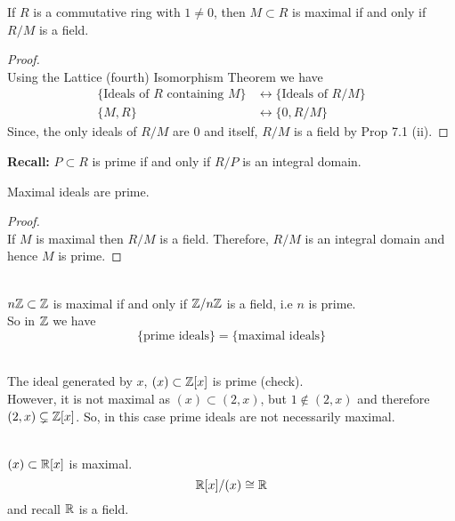 \documentclass[../Main.tex]{subfiles}
\begin{document}
\begin{thm}[title = \texorpdfstring{$M$}{M} maximal in comm. \texorpdfstring{$R \Longleftrightarrow R/M$}{R iff R/M} is field]
	If $R$ is a commutative ring with $1\ne 0$, then $M\subset R$ is maximal if and only if $R/M$ is a field.
\end{thm}

\begin{proof}~\\
	Using the Lattice (fourth) Isomorphism Theorem  we have
	\begin{align*}
	\{\text{Ideals of } R \text{ containing } M \} &\longleftrightarrow \{\text{Ideals of } R/M\}\\
	\{M,R\} &\longleftrightarrow \{0, R/M\}
	\end{align*}
	Since, the only ideals of $R/M$ are $0$ and itself, $R/M$ is a field by Prop 7.1 (ii).
\end{proof}
\textbf{Recall:} $P\subset R$ is prime if and only if $R/P$ is an integral domain.
\begin{crl}[title= Maximal ideals are prime]
	Maximal ideals are prime.
\end{crl}
\begin{proof}~\\
	If $M$ is maximal then $R/M$ is a field. Therefore, $R/M$ is an integral domain and hence $M$ is prime.
\end{proof}
\begin{example}~\\
	$n\mathbb{Z}\subset \mathbb{Z}$ is maximal if and only if $\mathbb{Z}/n\mathbb{Z}$ is a field, i.e $n$ is prime.\\
	So in $\mathbb{Z}$ we have
	\[\{\text{prime ideals}\} =\{\text{maximal ideals}\} \]
\end{example}
\begin{example}~\\
	The ideal generated by $x$, $(x) \subset \mathbb{Z}[x]$ is prime (check).\\
	However, it is not maximal as $(x) \subset (2,x)$, but $1\notin (2,x)$ and therefore $(2,x) \subsetneq \mathbb{Z}[x]$.
	So, in this case prime ideals are not necessarily maximal.
\end{example}
\begin{example}~\\
	$(x)\subset \mathbb{R}[x]$ is maximal.
	\[\mathbb{R}[x]/(x) \cong \mathbb{R}\]
	and recall $\mathbb{R}$ is a field.
\end{example}
\end{document}
